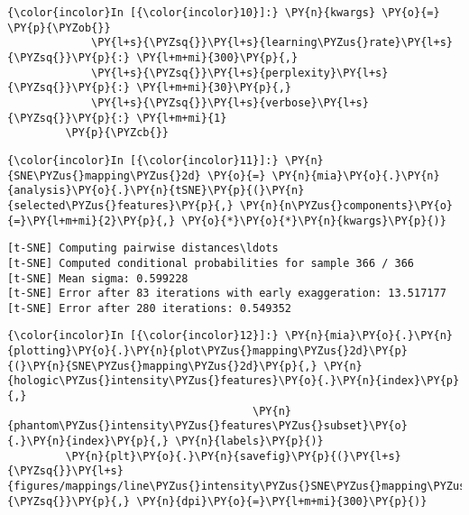     \begin{Verbatim}[commandchars=\\\{\}]
{\color{incolor}In [{\color{incolor}10}]:} \PY{n}{kwargs} \PY{o}{=} \PY{p}{\PYZob{}}
             \PY{l+s}{\PYZsq{}}\PY{l+s}{learning\PYZus{}rate}\PY{l+s}{\PYZsq{}}\PY{p}{:} \PY{l+m+mi}{300}\PY{p}{,}
             \PY{l+s}{\PYZsq{}}\PY{l+s}{perplexity}\PY{l+s}{\PYZsq{}}\PY{p}{:} \PY{l+m+mi}{30}\PY{p}{,}
             \PY{l+s}{\PYZsq{}}\PY{l+s}{verbose}\PY{l+s}{\PYZsq{}}\PY{p}{:} \PY{l+m+mi}{1}
         \PY{p}{\PYZcb{}}
\end{Verbatim}

    \begin{Verbatim}[commandchars=\\\{\}]
{\color{incolor}In [{\color{incolor}11}]:} \PY{n}{SNE\PYZus{}mapping\PYZus{}2d} \PY{o}{=} \PY{n}{mia}\PY{o}{.}\PY{n}{analysis}\PY{o}{.}\PY{n}{tSNE}\PY{p}{(}\PY{n}{selected\PYZus{}features}\PY{p}{,} \PY{n}{n\PYZus{}components}\PY{o}{=}\PY{l+m+mi}{2}\PY{p}{,} \PY{o}{*}\PY{o}{*}\PY{n}{kwargs}\PY{p}{)}
\end{Verbatim}

    \begin{Verbatim}[commandchars=\\\{\}]
[t-SNE] Computing pairwise distances\ldots
[t-SNE] Computed conditional probabilities for sample 366 / 366
[t-SNE] Mean sigma: 0.599228
[t-SNE] Error after 83 iterations with early exaggeration: 13.517177
[t-SNE] Error after 280 iterations: 0.549352
    \end{Verbatim}

    \begin{Verbatim}[commandchars=\\\{\}]
{\color{incolor}In [{\color{incolor}12}]:} \PY{n}{mia}\PY{o}{.}\PY{n}{plotting}\PY{o}{.}\PY{n}{plot\PYZus{}mapping\PYZus{}2d}\PY{p}{(}\PY{n}{SNE\PYZus{}mapping\PYZus{}2d}\PY{p}{,} \PY{n}{hologic\PYZus{}intensity\PYZus{}features}\PY{o}{.}\PY{n}{index}\PY{p}{,}
                                      \PY{n}{phantom\PYZus{}intensity\PYZus{}features\PYZus{}subset}\PY{o}{.}\PY{n}{index}\PY{p}{,} \PY{n}{labels}\PY{p}{)}
         \PY{n}{plt}\PY{o}{.}\PY{n}{savefig}\PY{p}{(}\PY{l+s}{\PYZsq{}}\PY{l+s}{figures/mappings/line\PYZus{}intensity\PYZus{}SNE\PYZus{}mapping\PYZus{}2d.png}\PY{l+s}{\PYZsq{}}\PY{p}{,} \PY{n}{dpi}\PY{o}{=}\PY{l+m+mi}{300}\PY{p}{)}
\end{Verbatim}

    \begin{center}
    \end{center}
    { \hspace*{\fill} \\}

